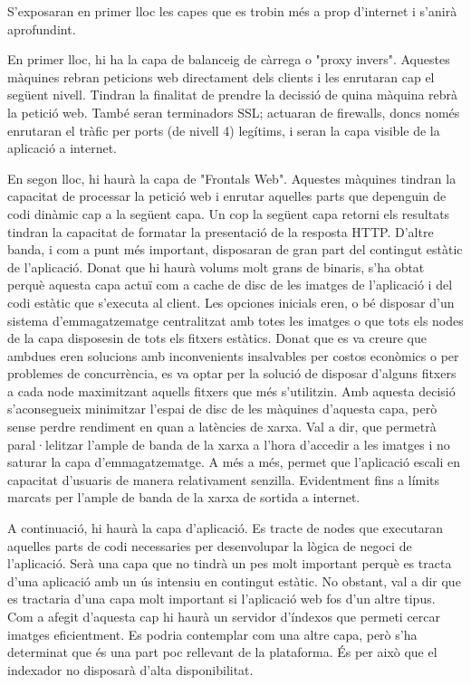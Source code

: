 \documentclass[a4paper, 11pt]{article}
\begin{document}
S'exposaran en primer lloc les capes que es trobin més a prop d'internet i s'anirà aprofundint.

En primer lloc, hi ha la capa de balanceig de càrrega o "proxy invers". Aquestes màquines rebran peticions web directament dels clients i les enrutaran cap el següent nivell. Tindran la finalitat de prendre la decissió de quina màquina rebrà la petició web. També seran terminadors SSL; actuaran de firewalls, doncs només enrutaran el tràfic per ports (de nivell 4) legítims, i seran la capa visible de la aplicació a internet.

En segon lloc, hi haurà la capa de "Frontals Web". Aquestes màquines tindran la capacitat de processar la petició web i enrutar aquelles parts que depenguin de codi dinàmic cap a la següent capa. Un cop la següent capa retorni els resultats tindran la capacitat de formatar la presentació de la resposta HTTP. D'altre banda, i com a punt més important, disposaran de gran part del contingut estàtic de l'aplicació. Donat que hi haurà volums molt grans de binaris, s'ha obtat perquè aquesta capa actuï com a cache de disc de les imatges de l'aplicació i del codi estàtic que s'executa al client. Les opciones inicials eren, o bé disposar d'un sistema d'emmagatzematge centralitzat amb totes les imatges o que tots els nodes de la capa disposesin de tots els fitxers estàtics. Donat que es va creure que ambdues eren solucions amb inconvenients insalvables per costos econòmics o per problemes de concurrència, es va optar per la solució de disposar d'alguns fitxers a cada node maximitzant aquells fitxers que més s'utilitzin.
Amb aquesta decisió s'aconsegueix minimitzar l'espai de disc de les màquines d'aquesta capa, però sense perdre rendiment en quan a latències de xarxa. Val a dir, que permetrà paral·lelitzar l'ample de banda de la xarxa a l'hora d'accedir a les imatges i no saturar la capa d'emmagatzematge. A més a més, permet que l'aplicació escali en capacitat d'usuaris de manera relativament senzilla. Evidentment fins a límits marcats per l'ample de banda de la xarxa de sortida a internet.   

A continuació, hi haurà la capa d'aplicació. Es tracte de nodes que executaran aquelles parts de codi necessaries per desenvolupar la lògica de negoci de l'aplicació. Serà una capa que no tindrà un pes molt important perquè es tracta d'una aplicació amb un ús intensiu en contingut estàtic. No obstant, val a dir que es tractaria d'una capa molt important si l'aplicació web fos d'un altre tipus.
Com a afegit d'aquesta cap hi haurà un servidor d'índexos que permeti cercar imatges eficientment. Es podria contemplar com una altre capa, però s'ha determinat que és una part poc rellevant de la plataforma. És per això que el indexador no disposarà d'alta disponibilitat.
\end{document}
